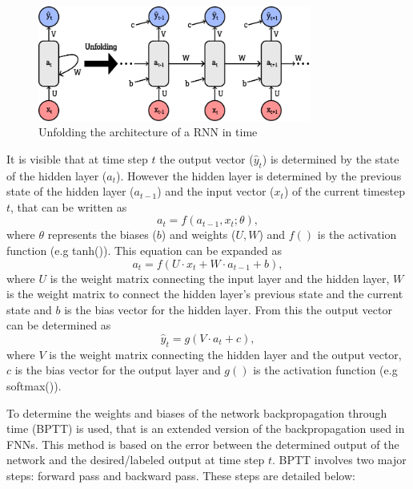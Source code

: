 \FloatBarrier
\begin{figure}[h]
    \centering
    \includegraphics[width=0.8\textwidth]{images/unfolded_rnn.pdf}
    \caption{Unfolding the architecture of a RNN in time}
    \label{fig:unfolded_RNN}
\end{figure}
\FloatBarrier

It is visible that at time step $t$ the output vector ($\hat y_t$) is determined by the state of the hidden layer ($a_t$). However the hidden layer is determined by the previous state of the hidden layer ($a_{t-1}$) and the input vector ($x_t$) of the current timestep $t$, that can be written as
\begin{equation}
    a_t = f(a_{t-1}, x_t; \theta),
\end{equation}
where $\theta$ represents the biases ($b$) and weights ($U, W$)  and $f()$ is the activation function (e.g tanh()). This equation can be expanded as
\begin{equation}
    a_t = f(U\cdot x_t + W \cdot a_{t-1} + b),
\end{equation}
where $U$ is the weight matrix connecting the input layer and the hidden layer, $W$ is the weight matrix to connect the hidden layer's previous state and the current state and $b$ is the bias vector for the hidden layer. From this the output vector can be determined as
\begin{equation}
    \hat y_t = g(V \cdot a_t + c),
\end{equation}
where $V$ is the weight matrix connecting the hidden layer and the output vector, $c$ is the bias vector for the output layer and $g()$ is the activation function (e.g softmax()).

To determine the weights and biases of the network backpropagation through time (BPTT) is used, that is an extended version of the backpropagation used in FNNs. This method is based on the error between the determined output of the network and the desired/labeled output at time step $t$. BPTT involves two major steps: forward pass and backward pass. These steps are detailed below:

